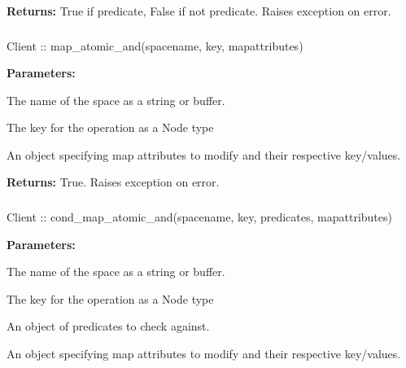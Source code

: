 \noindent\textbf{Returns:}
True if predicate, False if not predicate.  Raises exception on error.

\subsubsection{}
\label{api:nodejs:map_atomic_and}
\begin{javascriptcode}
Client :: map_atomic_and(spacename, key, mapattributes)
\end{javascriptcode}


\noindent\textbf{Parameters:}
\begin{description}[labelindent=\widthof{{\code{mapattributes}}},leftmargin=*,noitemsep,nolistsep,align=right]
\item[\code{spacename}] The name of the space as a string or buffer.
\item[\code{key}] The key for the operation as a Node type
\item[\code{mapattributes}] An object specifying map attributes to modify and their respective key/values.
\end{description}

\noindent\textbf{Returns:}
True.  Raises exception on error.

\subsubsection{}
\label{api:nodejs:cond_map_atomic_and}
\begin{javascriptcode}
Client :: cond_map_atomic_and(spacename, key, predicates, mapattributes)
\end{javascriptcode}


\noindent\textbf{Parameters:}
\begin{description}[labelindent=\widthof{{\code{mapattributes}}},leftmargin=*,noitemsep,nolistsep,align=right]
\item[\code{spacename}] The name of the space as a string or buffer.
\item[\code{key}] The key for the operation as a Node type
\item[\code{predicates}] An object of predicates to check against.
\item[\code{mapattributes}] An object specifying map attributes to modify and their respective key/values.
\end{description}

